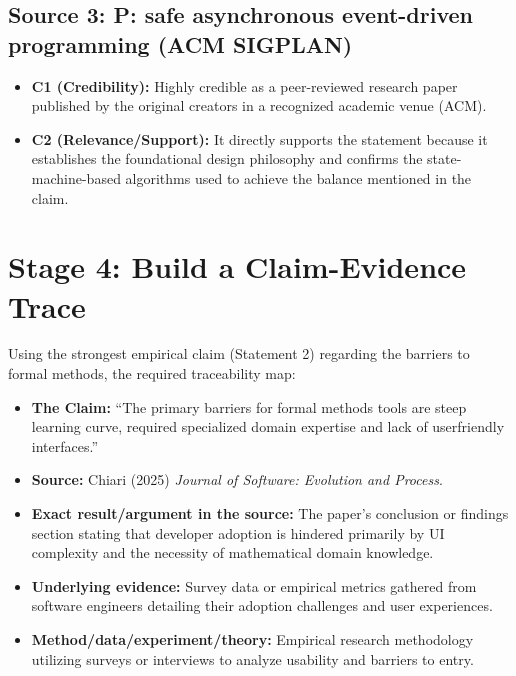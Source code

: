 \documentclass{article}
\begin{document}
\subsection*{Source 3: P: safe asynchronous event-driven programming (ACM SIGPLAN)}
\begin{itemize}
    \item \textbf{C1 (Credibility):} Highly credible as a peer-reviewed research paper published by the original creators in a recognized academic venue (ACM).
    \item \textbf{C2 (Relevance/Support):} It directly supports the statement because it establishes the foundational design philosophy and confirms the state-machine-based algorithms used to achieve the balance mentioned in the claim.
\end{itemize}





\section*{Stage 4: Build a Claim-Evidence Trace}
Using the strongest empirical claim (Statement 2) regarding the barriers to formal methods, the required traceability map:

\begin{itemize}
    \item \textbf{The Claim:} ``The primary barriers for formal methods tools are steep learning curve, required specialized domain expertise and lack of userfriendly interfaces.''
    \item[$\downarrow$] \textbf{Source:} Chiari (2025) \textit{Journal of Software: Evolution and Process}.
    \item[$\downarrow$] \textbf{Exact result/argument in the source:} The paper's conclusion or findings section stating that developer adoption is hindered primarily by UI complexity and the necessity of mathematical domain knowledge.
    \item[$\downarrow$] \textbf{Underlying evidence:} Survey data or empirical metrics gathered from software engineers detailing their adoption challenges and user experiences.
    \item[$\downarrow$] \textbf{Method/data/experiment/theory:} Empirical research methodology utilizing surveys or interviews to analyze usability and barriers to entry.
\end{itemize}
\end{document}
